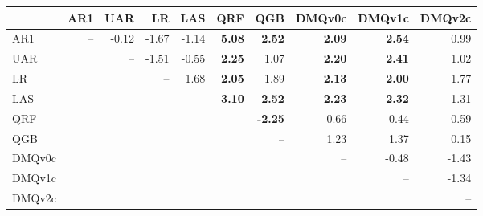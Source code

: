 \begin{tabular}{lrrrrrrrrr}
\toprule
 & AR1 & UAR & LR & LAS & QRF & QGB & DMQv0c & DMQv1c & DMQv2c \\
\midrule
AR1 & -- & -0.12 & -1.67 & -1.14 & \textbf{5.08} & \textbf{2.52} & \textbf{2.09} & \textbf{2.54} & 0.99 \\
UAR &  & -- & -1.51 & -0.55 & \textbf{2.25} & 1.07 & \textbf{2.20} & \textbf{2.41} & 1.02 \\
LR &  &  & -- & 1.68 & \textbf{2.05} & 1.89 & \textbf{2.13} & \textbf{2.00} & 1.77 \\
LAS &  &  &  & -- & \textbf{3.10} & \textbf{2.52} & \textbf{2.23} & \textbf{2.32} & 1.31 \\
QRF &  &  &  &  & -- & \textbf{-2.25} & 0.66 & 0.44 & -0.59 \\
QGB &  &  &  &  &  & -- & 1.23 & 1.37 & 0.15 \\
DMQv0c &  &  &  &  &  &  & -- & -0.48 & -1.43 \\
DMQv1c &  &  &  &  &  &  &  & -- & -1.34 \\
DMQv2c &  &  &  &  &  &  &  &  & -- \\
\bottomrule
\end{tabular}
